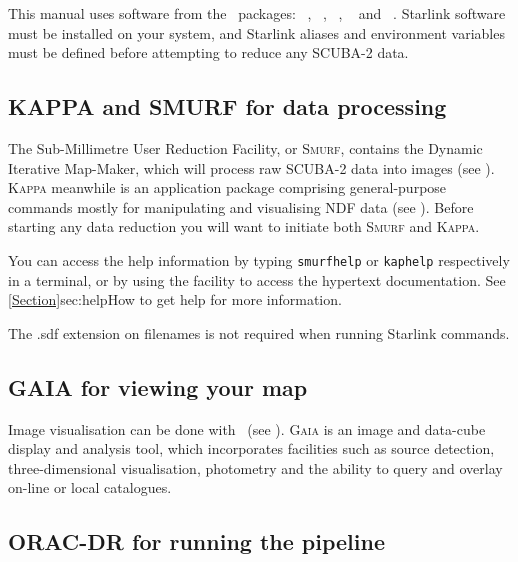 \documentclass[11pt,oneside,chapters]{starlink}
\begin{document}
This manual uses software from the \starlink\ packages: \smurf\
\cite{smurf}, \Kappa\ \cite{kappa}, \gaia\ \cite{gaia}, \oracdr\
\cite{oracdr} and \picard\ \cite{picard}. Starlink software must be
installed on your system, and Starlink aliases and environment
variables must be defined before attempting to reduce any SCUBA-2
data.


\subsection{KAPPA and SMURF for data processing}

The Sub-Millimetre User Reduction Facility, or \textsc{Smurf},
contains the Dynamic Iterative Map-Maker, which will process raw
SCUBA-2 data into images (see \smurfsun). \textsc{Kappa} meanwhile is
an application package comprising general-purpose commands mostly for
manipulating and visualising NDF data (see \kappasun). Before starting
any data reduction you will want to initiate both \textsc{Smurf} and
\textsc{Kappa}.

\begin{terminalv}
\end{terminalv}

You can access the help information by typing \texttt{smurfhelp} or
\texttt{kaphelp} respectively in a terminal, or by using the
\task{showme} facility to access the hypertext documentation. See
\cref{Section}{sec:help}{How to get help} for more information.



\begin{tip}
The .sdf extension on filenames is not required when running
Starlink commands.
\end{tip}


\subsection{GAIA for viewing your map}

Image visualisation can be done with \gaia\ (see
\gaiasun). \textsc{Gaia} is an image and data-cube display and
analysis tool, which incorporates facilities such as source detection,
three-dimensional visualisation, photometry and the ability to query
and overlay on-line or local catalogues.
\begin{terminalv}
\end{terminalv}

\subsection{ORAC-DR for running the pipeline}
\end{document}
